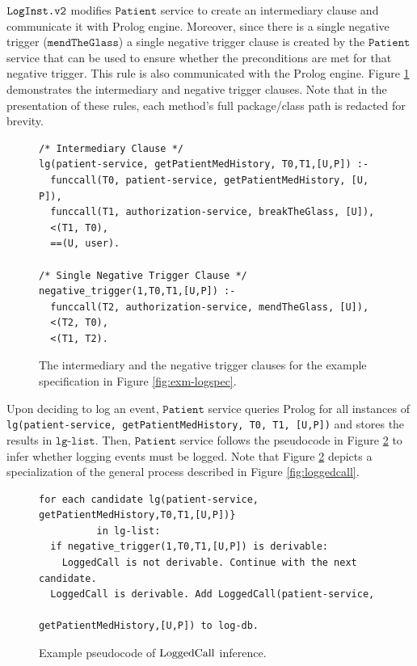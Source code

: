 $\texttt{LogInst.v2}$ modifies $\mathtt{Patient}$ service to create an intermediary clause and communicate it with Prolog engine. Moreover, since there is a single negative trigger ($\texttt{mendTheGlass}$) a single negative trigger clause is created by the $\mathtt{Patient}$ service that can be used to ensure whether the preconditions are met for that negative trigger. This rule is also communicated with the Prolog engine.  Figure \ref{fig:exm-intermediary} demonstrates the intermediary and negative trigger clauses. Note that in the presentation of these rules, each method's full package/class path is redacted for brevity. 

\begin{figure}
\begin{tiny}
\begin{Verbatim}[frame=single]
/* Intermediary Clause */
lg(patient-service, getPatientMedHistory, T0,T1,[U,P]) :- 
  funccall(T0, patient-service, getPatientMedHistory, [U, P]),
  funccall(T1, authorization-service, breakTheGlass, [U]),
  <(T1, T0),
  ==(U, user).

/* Single Negative Trigger Clause */ 
negative_trigger(1,T0,T1,[U,P]) :-
  funccall(T2, authorization-service, mendTheGlass, [U]),
  <(T2, T0),
  <(T1, T2).
\end{Verbatim}
\end{tiny}
\caption{The intermediary and the negative trigger clauses for the example specification in Figure \ref{fig:exm-logspec}.}
\label{fig:exm-intermediary}
\end{figure}

Upon deciding to log an event, $\mathtt{Patient}$ service queries Prolog for all instances of \texttt{lg(patient-service, getPatientMedHistory, T0, T1, [U,P])} and stores the results in $\texttt{lg-list}$. Then, $\mathtt{Patient}$ service follows the pseudocode in Figure \ref{fig:exm-loggedcall} to infer whether logging events must be logged. Note that Figure \ref{fig:exm-loggedcall} depicts a specialization of the general process described in  Figure \ref{fig:loggedcall}.

\begin{figure}
\begin{tiny}
\begin{Verbatim}[frame=single]
for each candidate lg(patient-service, getPatientMedHistory,T0,T1,[U,P])} 
          in lg-list:
  if negative_trigger(1,T0,T1,[U,P]) is derivable:
    LoggedCall is not derivable. Continue with the next candidate. 
  LoggedCall is derivable. Add LoggedCall(patient-service, 
                                          getPatientMedHistory,[U,P]) to log-db.
\end{Verbatim}
\end{tiny}
\caption{Example pseudocode of $\mathrm{LoggedCall}$ inference.}
\label{fig:exm-loggedcall}
\end{figure}






